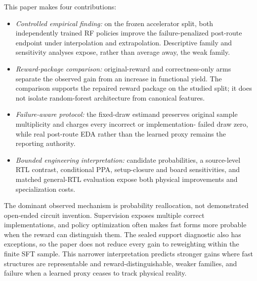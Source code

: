 This paper makes four contributions:

\begin{itemize}
    \item \emph{Controlled empirical finding:} on the frozen accelerator split,
    both independently trained RF policies improve the failure-penalized
    post-route endpoint under interpolation and extrapolation.  Descriptive
    family and sensitivity analyses expose, rather than average away, the weak
    family.
    \item \emph{Reward-package comparison:} original-reward and correctness-only
    arms separate the observed gain from an increase in functional yield.
    The comparison supports the repaired reward package on the studied split;
    it does not isolate random-forest architecture from canonical features.
    \item \emph{Failure-aware protocol:} the fixed-draw estimand preserves
    original sample multiplicity and charges every incorrect or implementation-
    failed draw zero, while real post-route EDA rather than the learned proxy
    remains the reporting authority.
    \item \emph{Bounded engineering interpretation:} candidate probabilities,
    a source-level RTL contrast, conditional PPA, setup-closure and board
    sensitivities, and matched general-RTL evaluation expose both physical
    improvements and specialization costs.
\end{itemize}

The dominant observed mechanism is probability reallocation, not demonstrated
open-ended circuit invention.  Supervision exposes multiple correct
implementations, and policy optimization often makes fast forms more probable
when the reward can distinguish them.  The sealed support diagnostic also has
exceptions, so the paper does not reduce every gain to reweighting within the
finite SFT sample.  This narrower interpretation predicts stronger gains where
fast structures are representable and reward-distinguishable, weaker families,
and failure when a learned proxy ceases to track physical reality.
